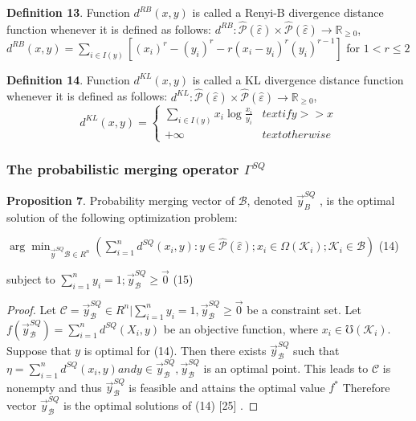 \documentclass[]{iosart2c}
\begin{document}
    \textbf{Definition 13}. Function $d^{RB}(x, y)$ is called a Renyi-B divergence distance function whenever it is defined as follows: $d^{RB} : \hat{\mathcal{P}}(\hat{\varepsilon}) \times \hat{\mathcal{P}} (\hat{\varepsilon}) \to \mathbb{R}_{\ge 0}$, $d^{RB}(x, y)=\sum_{i\in I(y)}[(x_i)^r - (y_i)^r - r(x_i - y_i)^r(y_i)^{r-1}]$ for $1 < r \le 2$

    \textbf{Definition 14}. Function $d^{KL}(x, y)$ is called a KL divergence distance function whenever it is defined as follows: $d^{KL} : \hat{\mathcal{P}} (\hat{\varepsilon}) \times \hat{\mathcal{P}} (\hat{\varepsilon}) \to \mathbb{R}_{\geq0}$, $$d^{KL}(x, y) =
    \begin{cases}
        \sum_{i \in I(y)} {x_i \log{\frac{x_i}{y_i}}} &text{if} y >> x \\
        +\infty    &text{otherwise}
    \end{cases}
    $$

    \subsubsection{The probabilistic merging operator $\Gamma^{SQ}$}

    \textbf{Proposition 7}. Probability merging vector of $\mathcal{B}$, denoted $\vec{y}^{SQ}_B$ , is the optimal solution of the following optimization problem:

    $\arg \min_{\vec{y}^{SQ}\mathcal{B} \in R^n}\left( \sum^n_{i=1} d^{SQ}(x_i, y) : y \in \hat{\mathcal{P}} (\hat{\varepsilon});x_i \in \Omega(\mathcal{K}_i);\mathcal{K}_i \in \mathcal{B} \right)$ (14)

    subject to $\sum^n_{i=1}y_i = 1;\vec{y}^{SQ}_\mathcal{B} \geq \vec{0}$ (15)

    \begin{proof}
        Let $\mathcal{C} = {\vec{y}^{SQ}_\mathcal{B} \in R^n | \sum^n_{i=1}  y_i = 1, \vec{y}^{SQ}_\mathcal{B} \geq \vec{0}}$ be a constraint set. Let $f(\vec{y}^{SQ}_\mathcal{B} ) = \sum^n_{i=1} d^{SQ}(X_i, y)$ be an objective function, where $x_i \in \mho(\mathcal{K}_i)$. Suppose that $y$ is optimal for (14). Then there exists $\vec{y}^{SQ}_\mathcal{B}$ such that $\eta = \sum^n_{i=1} d^{SQ}(x_i, y) and y \in \vec{y}^{SQ}_\mathcal{B} , \vec{y}^{SQ}_\mathcal{B}$ is an optimal point. This leads to $\mathcal{C}$ is nonempty and thus $\vec{y}^{SQ}_\mathcal{B}$ is feasible and attains the optimal value $f^*$ Therefore vector $\vec{y}^{SQ}_\mathcal{B}$ is the optimal solutions of (14) [25] .
    \end{proof}
\end{document}
